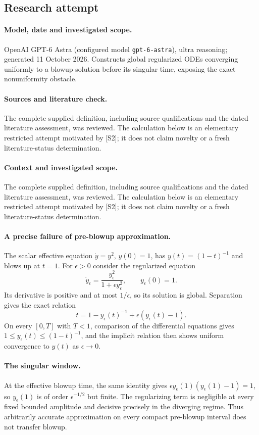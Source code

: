 \documentclass[11pt]{article}
\begin{document}
\subsection{Research attempt}
\paragraph{Model, date and investigated scope.}
OpenAI GPT-6 Astra (configured model \texttt{gpt-6-astra}), ultra reasoning; generated 11 October 2026. Constructs global regularized ODEs converging uniformly to a blowup solution before its singular time, exposing the exact nonuniformity obstacle.

\paragraph{Sources and literature check.}
The complete supplied definition, including source qualifications and the dated literature assessment, was reviewed. The calculation below is an elementary restricted attempt motivated by [S2]; it does not claim novelty or a fresh literature-status determination.

\paragraph{Context and investigated scope.} The complete supplied definition, including source qualifications and the dated literature assessment, was reviewed. The calculation below is an elementary restricted attempt motivated by [S2]; it does not claim novelty or a fresh literature-status determination.

\paragraph{A precise failure of pre-blowup approximation.} The scalar effective equation $\dot y=y^2$, $y(0)=1$, has $y(t)=(1-t)^{-1}$ and blows up at $t=1$. For $\epsilon>0$ consider the regularized equation
\[
 \dot y_\epsilon=\frac{y_\epsilon^2}{1+\epsilon y_\epsilon^2},\qquad y_\epsilon(0)=1.
\]
Its derivative is positive and at most $1/\epsilon$, so its solution is global. Separation gives the exact relation
\[
 t=1-y_\epsilon(t)^{-1}+\epsilon(y_\epsilon(t)-1).
\]
On every $[0,T]$ with $T<1$, comparison of the differential equations gives $1\leq y_\epsilon(t)\leq(1-t)^{-1}$, and the implicit relation then shows uniform convergence to $y(t)$ as $\epsilon\to0$.

\paragraph{The singular window.} At the effective blowup time, the same identity gives $\epsilon y_\epsilon(1)(y_\epsilon(1)-1)=1$, so $y_\epsilon(1)$ is of order $\epsilon^{-1/2}$ but finite. The regularizing term is negligible at every fixed bounded amplitude and decisive precisely in the diverging regime. Thus arbitrarily accurate approximation on every compact pre-blowup interval does not transfer blowup.
\end{document}
